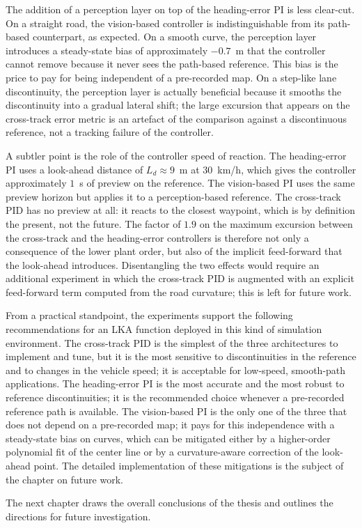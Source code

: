 The addition of a perception layer on top of the heading-error PI is less clear-cut. On a straight road, the vision-based controller is indistinguishable from its path-based counterpart, as expected. On a smooth curve, the perception layer introduces a steady-state bias of approximately $-0.7$~m that the controller cannot remove because it never sees the path-based reference. This bias is the price to pay for being independent of a pre-recorded map. On a step-like lane discontinuity, the perception layer is actually beneficial because it smooths the discontinuity into a gradual lateral shift; the large excursion that appears on the cross-track error metric is an artefact of the comparison against a discontinuous reference, not a tracking failure of the controller.

A subtler point is the role of the controller speed of reaction. The heading-error PI uses a look-ahead distance of $L_d \approx 9$~m at $30$~km/h, which gives the controller approximately $1$~s of preview on the reference. The vision-based PI uses the same preview horizon but applies it to a perception-based reference. The cross-track PID has no preview at all: it reacts to the closest waypoint, which is by definition the present, not the future. The factor of $1.9$ on the maximum excursion between the cross-track and the heading-error controllers is therefore not only a consequence of the lower plant order, but also of the implicit feed-forward that the look-ahead introduces. Disentangling the two effects would require an additional experiment in which the cross-track PID is augmented with an explicit feed-forward term computed from the road curvature; this is left for future work.

From a practical standpoint, the experiments support the following recommendations for an \ac{LKA} function deployed in this kind of simulation environment. The cross-track PID is the simplest of the three architectures to implement and tune, but it is the most sensitive to discontinuities in the reference and to changes in the vehicle speed; it is acceptable for low-speed, smooth-path applications. The heading-error PI is the most accurate and the most robust to reference discontinuities; it is the recommended choice whenever a pre-recorded reference path is available. The vision-based PI is the only one of the three that does not depend on a pre-recorded map; it pays for this independence with a steady-state bias on curves, which can be mitigated either by a higher-order polynomial fit of the center line or by a curvature-aware correction of the look-ahead point. The detailed implementation of these mitigations is the subject of the chapter on future work.

The next chapter draws the overall conclusions of the thesis and outlines the directions for future investigation.
